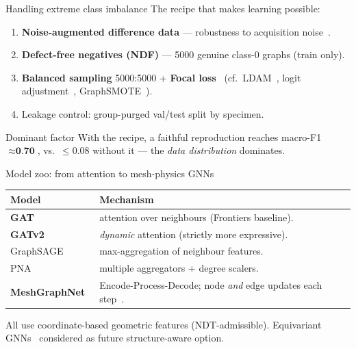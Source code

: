\documentclass[aspectratio=169,10pt]{beamer}
\begin{document}
\begin{frame}{Handling extreme class imbalance}
The recipe that makes learning possible:
\begin{enumerate}
  \item \textbf{Noise-augmented difference data} — robustness to acquisition noise~\cite{rong2020dropedge}.
  \item \textbf{Defect-free negatives (NDF)} — 5000 genuine class-0 graphs (train only).
  \item \textbf{Balanced sampling} 5000:5000 + \textbf{Focal loss}~\cite{lin2017focal}
        (cf.\ LDAM~\cite{cao2019learning}, logit adjustment~\cite{menon2020long},
        GraphSMOTE~\cite{zhao2021graphsmote}).
  \item Leakage control: group-purged val/test split by specimen.
\end{enumerate}
\vspace{0.5em}
\begin{alertblock}{Dominant factor}
With the recipe, a faithful reproduction reaches macro-F1 $\approx \textbf{0.70}$,
vs.\ $\le 0.08$ without it — the \emph{data distribution} dominates.
\end{alertblock}
\end{frame}

\begin{frame}{Model zoo: from attention to mesh-physics GNNs}
\begin{tabular}{p{2.4cm} p{8.0cm}}
\toprule
Model & Mechanism \\
\midrule
\textbf{GAT}~\cite{velickovic2018graph} & attention over neighbours (Frontiers baseline). \\
\textbf{GATv2}~\cite{brody2022how} & \emph{dynamic} attention (strictly more expressive). \\
GraphSAGE & max-aggregation of neighbour features. \\
PNA & multiple aggregators + degree scalers. \\
\textbf{MeshGraphNet}~\cite{pfaff2021learning} & Encode-Process-Decode; node \emph{and} edge
  updates each step~\cite{sanchezgonzalez2020learning}. \\
\bottomrule
\end{tabular}
\vspace{0.4em}
All use coordinate-based geometric features (NDT-admissible). Equivariant
GNNs~\cite{satorras2021equivariant} considered as future structure-aware option.
\end{frame}
\end{document}
